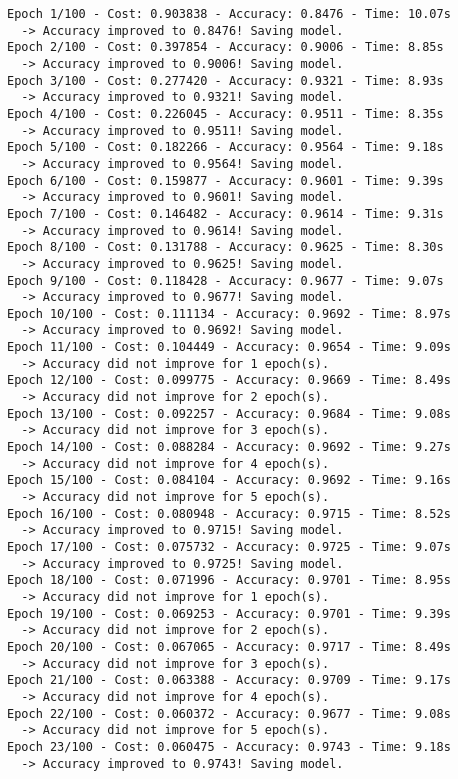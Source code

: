 \documentclass[11pt]{article}
\begin{document}
    \begin{Verbatim}[commandchars=\\\{\}]
Epoch 1/100 - Cost: 0.903838 - Accuracy: 0.8476 - Time: 10.07s
  -> Accuracy improved to 0.8476! Saving model.
Epoch 2/100 - Cost: 0.397854 - Accuracy: 0.9006 - Time: 8.85s
  -> Accuracy improved to 0.9006! Saving model.
Epoch 3/100 - Cost: 0.277420 - Accuracy: 0.9321 - Time: 8.93s
  -> Accuracy improved to 0.9321! Saving model.
Epoch 4/100 - Cost: 0.226045 - Accuracy: 0.9511 - Time: 8.35s
  -> Accuracy improved to 0.9511! Saving model.
Epoch 5/100 - Cost: 0.182266 - Accuracy: 0.9564 - Time: 9.18s
  -> Accuracy improved to 0.9564! Saving model.
Epoch 6/100 - Cost: 0.159877 - Accuracy: 0.9601 - Time: 9.39s
  -> Accuracy improved to 0.9601! Saving model.
Epoch 7/100 - Cost: 0.146482 - Accuracy: 0.9614 - Time: 9.31s
  -> Accuracy improved to 0.9614! Saving model.
Epoch 8/100 - Cost: 0.131788 - Accuracy: 0.9625 - Time: 8.30s
  -> Accuracy improved to 0.9625! Saving model.
Epoch 9/100 - Cost: 0.118428 - Accuracy: 0.9677 - Time: 9.07s
  -> Accuracy improved to 0.9677! Saving model.
Epoch 10/100 - Cost: 0.111134 - Accuracy: 0.9692 - Time: 8.97s
  -> Accuracy improved to 0.9692! Saving model.
Epoch 11/100 - Cost: 0.104449 - Accuracy: 0.9654 - Time: 9.09s
  -> Accuracy did not improve for 1 epoch(s).
Epoch 12/100 - Cost: 0.099775 - Accuracy: 0.9669 - Time: 8.49s
  -> Accuracy did not improve for 2 epoch(s).
Epoch 13/100 - Cost: 0.092257 - Accuracy: 0.9684 - Time: 9.08s
  -> Accuracy did not improve for 3 epoch(s).
Epoch 14/100 - Cost: 0.088284 - Accuracy: 0.9692 - Time: 9.27s
  -> Accuracy did not improve for 4 epoch(s).
Epoch 15/100 - Cost: 0.084104 - Accuracy: 0.9692 - Time: 9.16s
  -> Accuracy did not improve for 5 epoch(s).
Epoch 16/100 - Cost: 0.080948 - Accuracy: 0.9715 - Time: 8.52s
  -> Accuracy improved to 0.9715! Saving model.
Epoch 17/100 - Cost: 0.075732 - Accuracy: 0.9725 - Time: 9.07s
  -> Accuracy improved to 0.9725! Saving model.
Epoch 18/100 - Cost: 0.071996 - Accuracy: 0.9701 - Time: 8.95s
  -> Accuracy did not improve for 1 epoch(s).
Epoch 19/100 - Cost: 0.069253 - Accuracy: 0.9701 - Time: 9.39s
  -> Accuracy did not improve for 2 epoch(s).
Epoch 20/100 - Cost: 0.067065 - Accuracy: 0.9717 - Time: 8.49s
  -> Accuracy did not improve for 3 epoch(s).
Epoch 21/100 - Cost: 0.063388 - Accuracy: 0.9709 - Time: 9.17s
  -> Accuracy did not improve for 4 epoch(s).
Epoch 22/100 - Cost: 0.060372 - Accuracy: 0.9677 - Time: 9.08s
  -> Accuracy did not improve for 5 epoch(s).
Epoch 23/100 - Cost: 0.060475 - Accuracy: 0.9743 - Time: 9.18s
  -> Accuracy improved to 0.9743! Saving model.

\end{Verbatim}
\end{document}
